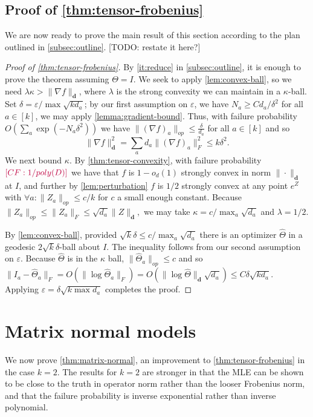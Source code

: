 \documentclass{article}
\renewcommand{\vec}{\bm}
\newcommand\eps{\varepsilon}
\newcommand{\CF}[1]{{\color{purple}[CF: #1]}}
\newcommand{\TODO}[1]{{\color{blue}[TODO: #1]}}
\begin{document}
\subsection{Proof of \cref{thm:tensor-frobenius}}
We are now ready to prove the main result of this section according to the plan outlined in \cref{subsec:outline}.
\TODO{restate it here?}
\begin{proof}[Proof of \cref{thm:tensor-frobenius}]By \cref{it:reduce} in \cref{subsec:outline}, it is enough to prove the theorem assuming $\Theta = I$.
We seek to apply \cref{lem:convex-ball}, so we need $\lambda \kappa > \|\nabla f\|_{\vec d}$, where $\lambda$ is the strong convexity we can maintain in a $\kappa$-ball. Set $\delta = \eps/\max \sqrt{k d_a}$; by our first assumption on $\eps$, we have $N_a \geq C d_a/\delta^2$ for all $a \in [k]$, we may apply \cref{lemma:gradient-bound}. Thus, with failure probability $O\left( \sum_a \exp ( - N_a \delta^2)\right)$ we have $\|(\nabla f)_{a}\|_{op} \leq \frac{\delta}{d_{a}}$ for all $a \in [k]$ and so
\[  \|\nabla f\|_{\vec d}^{2} = \sum_{a} d_{a} \|(\nabla f)_{a}\|_{F}^{2} \leq  k \delta^{2}.  \]
We next bound $\kappa$. By \cref{thm:tensor-convexity}, with failure probability $\CF{1/poly(D)}$ we have that $f$ is $1-o_{d}(1)$ strongly convex in norm $\|\cdot\|_{\vec d}$ at $I$, and further by \cref{lem:perturbation} $f$ is $1/2$ strongly convex at any point $e^{Z}$ with $\forall a: \|Z_{a}\|_{op} \leq  c/k$ for $c$ a small enough constant. Because $\|Z_a\|_{op} \leq \|Z_a\|_F \leq \sqrt{d_a} \|Z\|_{\vec d},$ we may take $\kappa = c/\max_a \sqrt{d_a}$ and $\lambda = 1/2$.

By \cref{lem:convex-ball}, provided $\sqrt{k} \delta \leq c/\max_a \sqrt{d_a} $ there is an optimizer $\widehat{\Theta}$ in a geodesic $2 \sqrt{k} \delta$-ball about $I$. The inequality follows from our second assumption on $\eps$. Because $\widehat{\Theta}$ is in the $\kappa$ ball, $\|\widehat{\Theta}_a\|_{op} \leq c$ and so $\|I_a - \widehat{\Theta}_a\|_F = O( \| \log \widehat{\Theta}_a\|_F) = O( \|\log \widehat{\Theta}\|_{\vec d} \sqrt{d_a})  \leq C \delta \sqrt{k d_a}.$ Applying $\eps = \delta \sqrt{k \max d_a}$ completes the proof.
\end{proof}

\section{Matrix normal models}\label{sec:matrix-normal}
We now prove \cref{thm:matrix-normal}, an improvement to \cref{thm:tensor-frobenius} in the case $k=2$. The results for $k = 2$ are stronger in that the MLE can be shown to be close to the truth in operator norm rather than the looser Frobenius norm, and that the failure probability is inverse exponential rather than inverse polynomial.
\end{document}
